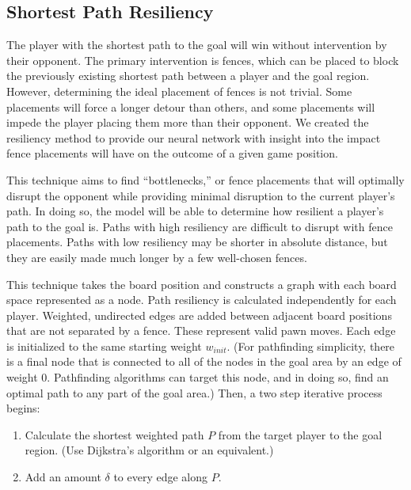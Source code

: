 \documentclass[10pt]{article}
\begin{document}
\subsection{Shortest Path Resiliency}

The player with the shortest path to the goal will win without intervention by their opponent. The primary intervention is fences, which can be placed to block the previously existing shortest path between a player and the goal region. However, determining the ideal placement of fences is not trivial. Some placements will force a longer detour than others, and some placements will impede the player placing them more than their opponent. We created the resiliency method to provide our neural network with insight into the  impact fence placements will have on the outcome of a given game position.

This technique aims to find ``bottlenecks,'' or fence placements that will optimally disrupt the opponent while providing minimal disruption to the current player's path. In doing so, the model will be able to determine how resilient a player's path to the goal is. Paths with high resiliency are difficult to disrupt with fence placements. Paths with low resiliency may be shorter in absolute distance, but they are easily made much longer by a few well-chosen fences.

This technique takes the board position and constructs a graph with each board space represented as a node. Path resiliency is calculated independently for each player. Weighted, undirected edges are added between adjacent board positions that are not separated by a fence. These represent valid pawn moves. Each edge is initialized to the same starting weight $w_{init}$.
(For pathfinding simplicity, there is a final node that is connected to all of the nodes in the goal area by an edge of weight 0. Pathfinding algorithms can target this node, and in doing so, find an optimal path to any part of the goal area.) %
Then, a two step iterative process begins:

\begin{enumerate}
    \item Calculate the shortest weighted path $P$ from the target player to the goal region. (Use Dijkstra's algorithm or an equivalent.)
    \item Add an amount $\delta$ to every edge along $P$.
\end{enumerate}
\end{document}
